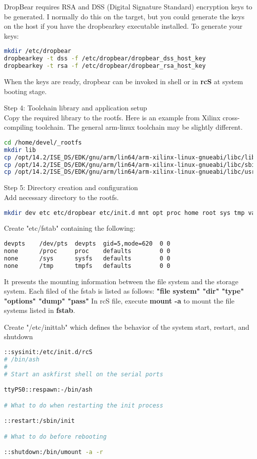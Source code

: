 \documentclass[12pt]{article} %
\begin{document}
DropBear requires RSA and DSS (Digital Signature Standard) encryption keys to be generated. 
I normally do this on the target, but you could generate the keys on the host if you 
have the dropbearkey executable installed.
To generate your keys:
\begin{lstlisting}[language=bash]
mkdir /etc/dropbear
dropbearkey -t dss -f /etc/dropbear/dropbear_dss_host_key  
dropbearkey -t rsa -f /etc/dropbear/dropbear_rsa_host_key 
\end{lstlisting}
When the keys are ready, dropbear can be invoked in shell or 
in \textbf{rcS} at system booting stage.

Step 4: Toolchain library and application setup \\
Copy the required library to the rootfs. Here is an example from Xilinx cross-compiling toolchain.
The general arm-linux toolchain may be slightly different.
\begin{lstlisting}[language=bash]
cd /home/devel/_rootfs
mkdir lib
cp /opt/14.2/ISE_DS/EDK/gnu/arm/lin64/arm-xilinx-linux-gnueabi/libc/lib/* lib -r
cp /opt/14.2/ISE_DS/EDK/gnu/arm/lin64/arm-xilinx-linux-gnueabi/libc/sbin/* sbin/ -r
cp /opt/14.2/ISE_DS/EDK/gnu/arm/lin64/arm-xilinx-linux-gnueabi/libc/usr/bin/* usr/bin/ -r
\end{lstlisting}

Step 5: Directory creation and configuration \\
Add necessary directory to the rootfs.
\begin{lstlisting}[language=bash]
mkdir dev etc etc/dropbear etc/init.d mnt opt proc home root sys tmp var var/log var/www
\end{lstlisting}

Create "etc/fstab" containing the following:
\begin{lstlisting}[language=bash]
devpts    /dev/pts  devpts  gid=5,mode=620  0 0
none      /proc     proc    defaults        0 0
none      /sys      sysfs   defaults        0 0
none      /tmp      tmpfs   defaults        0 0
\end{lstlisting}
It presents the mounting information between the file system and the storage system.
Each filed of the fstab is listed as follows:
\textbf{"file system" "dir" "type" "options" "dump" "pass"}
In rcS file, execute \textbf{mount -a} to mount the file systems listed in \textbf{fstab}.

Create "/etc/inittab" which defines the behavior of the system start, restart, and shutdown
\begin{lstlisting}[language=bash]
::sysinit:/etc/init.d/rcS
# /bin/ash
# 
# Start an askfirst shell on the serial ports

ttyPS0::respawn:-/bin/ash

# What to do when restarting the init process

::restart:/sbin/init

# What to do before rebooting

::shutdown:/bin/umount -a -r
\end{lstlisting}
\end{document}
